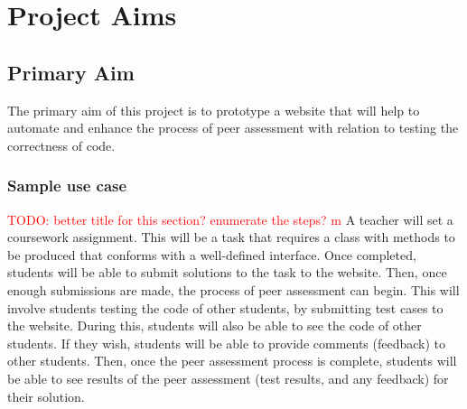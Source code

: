 \documentclass[a4paper,11pt]{report}
\newcommand{\todo}[1]{\textcolor{red}{TODO: #1}}
\begin{document}

\chapter{Project Aims}
\section{Primary Aim}
The primary aim of this project is to prototype a website that will help to automate and enhance the process of peer assessment with relation to testing the correctness of code.
\subsection*{Sample use case}
\todo{better title for this section? enumerate the steps? m}
A teacher will set a coursework assignment. This will be a task that requires a class with methods to be produced that conforms with a well-defined interface. Once completed, students will be able to submit solutions to the task to the website. Then, once enough submissions are made, the process of peer assessment can begin. This will involve students testing the code of other students, by submitting test cases to the website. During this, students will also be able to see the code of other students. If they wish, students will be able to provide comments (feedback) to other students. Then, once the peer assessment process is complete, students will be able to see results of the peer assessment (test results, and any feedback) for their solution.
\end{document}
